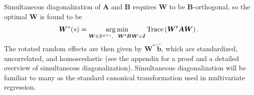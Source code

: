 \documentclass[12pt]{article} %
\newcommand{\trans}{\ensuremath{^\prime}}
\DeclareMathOperator{\tr}{Trace}
\DeclareMathOperator*{\argmin}{arg\, min}
\begin{document}
Simultaneous diagonalization of $\bm{A}$ and $\bm{B}$ requires $\bm{W}$ to be $\bm{B}$-orthogonal, so the optimal $\bm{W}$ is found to be
%
\begin{equation}\label{eq:optimw}
	\bm{W}^*(s) = \argmin_{ 
      \bm{W} \in \mathbb{R}^{q \times s}, \ \ 
      \bm{W\trans B W} = \bm{I}
	} 
\tr\left( \bm{W\trans A W} \right).
\end{equation}
%
The rotated random effects are then given by $\bm{W}^{*\prime} \widehat{\bm{b}}$, which are standardized, uncorrelated, and homoscedastic (see the appendix for a proof and a detailed overview of simultaneous diagonalization). %
Simultaneous diagonalization will be familiar to many as the standard canonical transformation used in multivariate regression. %
\end{document}
